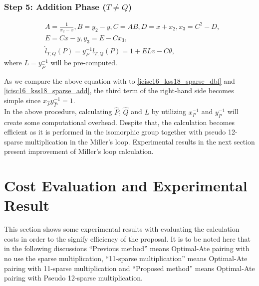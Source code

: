 \subsubsection{Step 5: Addition Phase \texorpdfstring{($T\neq Q$)}{}}
\begin{eqnarray}
&A=\frac{1}{x_2-x}, B=y_2-y, C=AB, D=x+x_2, x_3=C^2-D,\nonumber\\
&E=Cx-y, y_3=E-Cx_3,\nonumber\\
&\hat{l}_{T,Q}(P) = y^{-1}_Pl_{T,Q}(P)=1+ELv-C\theta,\label{pseudo_add}
\end{eqnarray}
where $L=y_{\hat{P}}^{-1}$ will be pre-computed.

As we compare the above equation with to \eqref{icisc16_kss18_sparse_dbl} and \eqref{icisc16_kss18_sparse_add}, the third term of the right-hand side becomes simple since $x_{\hat{P}}y_{\hat{P}}^{-1}=1$.\\
In the above procedure, calculating $\hat{P}$, $\hat{Q}$ and $L$ by utilizing $x_P^{-1}$ and $y_P^{-1}$ will create some computational overhead. Despite that, the calculation becomes efficient as it is performed in the isomorphic group together with pseudo 12-sparse multiplication in the Miller's loop. Experimental results in the next section present improvement of Miller's loop calculation. 


\section{Cost Evaluation and Experimental Result}
This section shows some experimental results with evaluating the calculation costs in order to the signify efficiency of the proposal.
It is to be noted here that in the following discussions ``Previous method'' means Optimal-Ate pairing with no use the sparse multiplication, ``11-sparse multiplication'' means Optimal-Ate pairing with 11-sparse multiplication and ``Proposed method'' means Optimal-Ate pairing with Pseudo 12-sparse multiplication.
